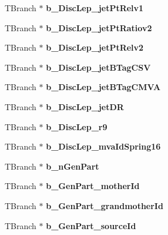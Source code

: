 \begin{DoxyCompactItemize}
T\+Branch $\ast$ {\bfseries b\+\_\+\+Disc\+Lep\+\_\+jet\+Pt\+Relv1}
\item 
\hypertarget{classMiniTree_a7af205654ad1fae6933dc9754c6a40d9}{}\label{classMiniTree_a7af205654ad1fae6933dc9754c6a40d9} 
T\+Branch $\ast$ {\bfseries b\+\_\+\+Disc\+Lep\+\_\+jet\+Pt\+Ratiov2}
\item 
\hypertarget{classMiniTree_acc58003b11418d8a86ce3cceb0d0a58d}{}\label{classMiniTree_acc58003b11418d8a86ce3cceb0d0a58d} 
T\+Branch $\ast$ {\bfseries b\+\_\+\+Disc\+Lep\+\_\+jet\+Pt\+Relv2}
\item 
\hypertarget{classMiniTree_afba51258ec6960b97dfb8ee13a248c3c}{}\label{classMiniTree_afba51258ec6960b97dfb8ee13a248c3c} 
T\+Branch $\ast$ {\bfseries b\+\_\+\+Disc\+Lep\+\_\+jet\+B\+Tag\+C\+SV}
\item 
\hypertarget{classMiniTree_a2479f6144b510db5ab6230da79a4d674}{}\label{classMiniTree_a2479f6144b510db5ab6230da79a4d674} 
T\+Branch $\ast$ {\bfseries b\+\_\+\+Disc\+Lep\+\_\+jet\+B\+Tag\+C\+M\+VA}
\item 
\hypertarget{classMiniTree_aebf8b746b9c17c7132b44c489536c25f}{}\label{classMiniTree_aebf8b746b9c17c7132b44c489536c25f} 
T\+Branch $\ast$ {\bfseries b\+\_\+\+Disc\+Lep\+\_\+jet\+DR}
\item 
\hypertarget{classMiniTree_a89c2e574f56d46c2aae87d3910c0930e}{}\label{classMiniTree_a89c2e574f56d46c2aae87d3910c0930e} 
T\+Branch $\ast$ {\bfseries b\+\_\+\+Disc\+Lep\+\_\+r9}
\item 
\hypertarget{classMiniTree_a42deb0bc2b15caef67c3f51f736fd668}{}\label{classMiniTree_a42deb0bc2b15caef67c3f51f736fd668} 
T\+Branch $\ast$ {\bfseries b\+\_\+\+Disc\+Lep\+\_\+mva\+Id\+Spring16}
\item 
\hypertarget{classMiniTree_a172353254997e128dd1161c958f4d25f}{}\label{classMiniTree_a172353254997e128dd1161c958f4d25f} 
T\+Branch $\ast$ {\bfseries b\+\_\+n\+Gen\+Part}
\item 
\hypertarget{classMiniTree_a2d48fdab6f93911af1f129d868d87213}{}\label{classMiniTree_a2d48fdab6f93911af1f129d868d87213} 
T\+Branch $\ast$ {\bfseries b\+\_\+\+Gen\+Part\+\_\+mother\+Id}
\item 
\hypertarget{classMiniTree_ad0bcddfa9db686aee1034ae70ed313e4}{}\label{classMiniTree_ad0bcddfa9db686aee1034ae70ed313e4} 
T\+Branch $\ast$ {\bfseries b\+\_\+\+Gen\+Part\+\_\+grandmother\+Id}
\item 
\hypertarget{classMiniTree_a71866bc686a2c6d99e6c5d55544ec5f6}{}\label{classMiniTree_a71866bc686a2c6d99e6c5d55544ec5f6} 
T\+Branch $\ast$ {\bfseries b\+\_\+\+Gen\+Part\+\_\+source\+Id}

\end{DoxyCompactItemize}
